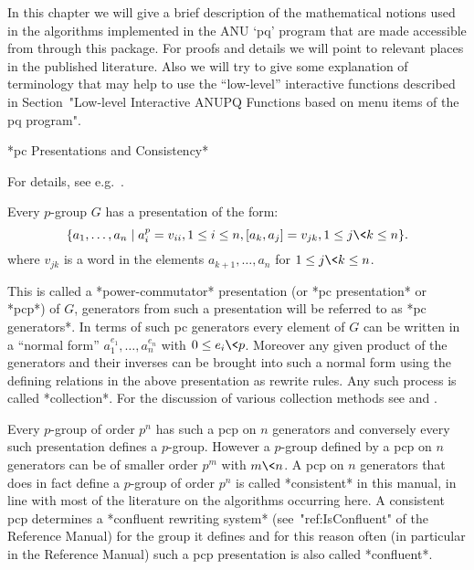 

In this chapter  we will give a brief  description of the mathematical
notions used in the algorithms  implemented in the ANU `pq' program
that are made accessible from {\GAP} through this package.  For proofs
and  details  we  will  point  to relevant  places  in  the  published
literature.  Also we will try  to give some explanation of terminology
that may help to use the ``low-level'' interactive functions described
in Section~"Low-level Interactive ANUPQ  Functions based on menu items
of the pq program".


*pc Presentations and Consistency*

For details, see e.g.~\cite{NNN98}.

Every $p$-group $G$ has a presentation of the form: 
$$
\{a_1,\dots,a_n \mid a_i^p = v_{ii}, 1 \le i \le n, 
               [a_k, a_j] = v_{jk}, 1 \le j \< k \le n \}.  
$$
where $v_{jk}$ is a word in the elements $a_{k+1},\dots,a_n$ for 
$1 \le j \< k \le n$.

This is called a *power-commutator* presentation (or *pc presentation*
or *pcp*) of $G$, generators from such a presentation will be referred
to as *pc generators*. In terms of such pc generators every element of
$G$ can be written in a  ``normal  form''  $a_1^{e_1},\dots,a_n^{e_n}$
with $0 \le e_i \< p$. Moreover any given product  of  the  generators
and their inverses can be brought into such a normal  form  using  the
defining relations in the above presentation  as  rewrite  rules.  Any
such process is called *collection*. For  the  discussion  of  various
collection methods see \cite{LGS90} and \cite{VL90a}.

Every  $p$-group of order  $p^n$ has  such a  pcp on $n$
generators and conversely every such presentation defines a $p$-group.
However a $p$-group defined by a pcp on $n$ generators can
be of  smaller order $p^m$ with  $m\<n$. A pcp on  $n$ generators that
does in fact define a  $p$-group of order $p^n$ is called *consistent*
in this manual, in line with  most of the literature on the algorithms
occurring  here. A  consistent pcp  determines a  *confluent rewriting
system* (see~"ref:IsConfluent" of the {\GAP} Reference Manual) for the
group  it defines  and for  this reason  often (in  particular  in the
{\GAP}  Reference  Manual) such  a  pcp  presentation  is also  called
*confluent*.

